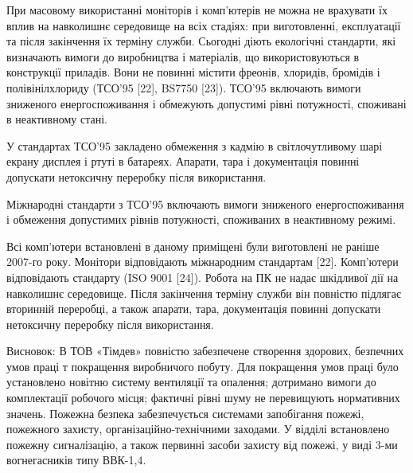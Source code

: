 При масовому використанні моніторів і комп’ютерів не можна не врахувати їх вплив на навколишнє середовище на всіх стадіях: при виготовленні, експлуатації та після закінчення їх терміну служби. Сьогодні діють екологічні стандарти, які визначають вимоги до виробництва і матеріалів, що використовуються в конструкції приладів. Вони не повинні містити фреонів, хлоридів, бромідів і полівінілхлориду (ТСО’95 [22], BS7750 [23]). ТСО’95 включають вимоги зниженого енергоспоживання і обмежують допустимі рівні потужності, споживані в неактивному стані.

У стандартах ТСО’95 закладено обмеження з кадмію в світлочутливому шарі екрану дисплея і ртуті в батареях. Апарати, тара і документація повинні допускати нетоксичну переробку після використання.

Міжнародні стандарти з ТСО’95 включають вимоги зниженого енергоспоживання і обмеження допустимих рівнів потужності, споживаних в неактивному режимі.

Всі комп’ютери встановлені в даному приміщені були виготовлені не раніше 2007-го року. Монітори відповідають міжнародним стандартам [22]. Комп’ютери відповідають стандарту (ISO 9001 [24]). Робота на ПК не надає шкідливої дії на навколишнє середовище. Після закінчення терміну служби він повністю підлягає вторинній переробці, а також апарати, тара, документація повинні допускати нетоксичну переробку після використання.

Висновок: В ТОВ «Тімдев» повністю забезпечене створення здорових, безпечних умов праці т покращення виробничого побуту. Для покращення умов праці було установлено новітню систему вентиляції та опалення; дотримано вимоги до комплектації робочого місця; фактичні рівні шуму не перевищують нормативних значень. Пожежна безпека забезпечується системами запобігання пожежі, пожежного захисту, організаційно-технічними заходами. У відділі встановлено пожежну сигналізацію, а також первинні засоби захисту від пожежі, у виді 3-ми вогнегасників типу ВВК-1,4.


